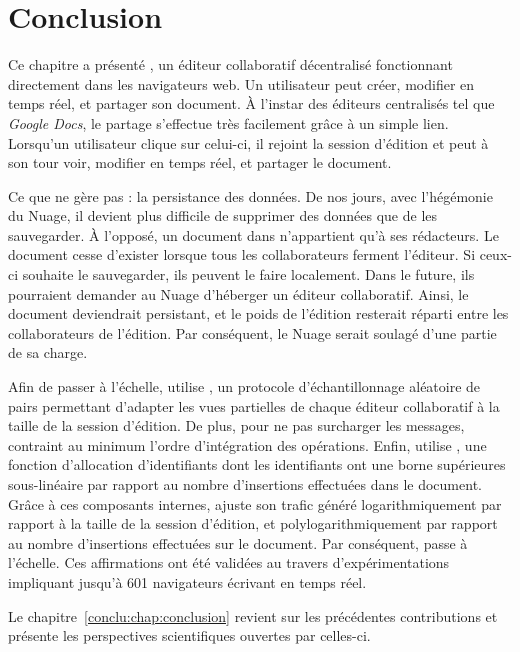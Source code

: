 
\section{Conclusion}
\label{editor:sec:conclusion}

Ce chapitre a présenté \CRATE, un éditeur collaboratif décentralisé fonctionnant
directement dans les navigateurs web. Un utilisateur peut créer, modifier en
temps réel, et partager son document. À l'instar des éditeurs centralisés tel
que \emph{Google Docs}, le partage s'effectue très facilement grâce à un simple
lien. Lorsqu'un utilisateur clique sur celui-ci, il rejoint la session d'édition
et peut à son tour voir, modifier en temps réel, et partager le document. 

Ce que \CRATE ne gère pas : la persistance des données. De nos jours, avec
l'hégémonie du Nuage, il devient plus difficile de supprimer des données que de
les sauvegarder. À l'opposé, un document dans \CRATE n'appartient qu'à ses
rédacteurs. Le document cesse d'exister lorsque tous les collaborateurs ferment
l'éditeur. Si ceux-ci souhaite le sauvegarder, ils peuvent le faire
localement. Dans le future, ils pourraient demander au Nuage d'héberger un
éditeur collaboratif. Ainsi, le document deviendrait persistant, et le poids de
l'édition resterait réparti entre les collaborateurs de l'édition. Par
conséquent, le Nuage serait soulagé d'une partie de sa charge.

Afin de passer à l'échelle, \CRATE utilise \SPRAY, un protocole
d'échantillonnage aléatoire de pairs permettant d'adapter les vues partielles de
chaque éditeur collaboratif à la taille de la session d'édition. De plus, pour
ne pas surcharger les messages, \CRATE contraint au minimum l'ordre
d'intégration des opérations. Enfin, \CRATE utilise \LSEQ, une fonction
d'allocation d'identifiants dont les identifiants ont une borne supérieures
sous-linéaire par rapport au nombre d'insertions effectuées dans le
document. Grâce à ces composants internes, \CRATE ajuste son trafic généré
logarithmiquement par rapport à la taille de la session d'édition, et
polylogarithmiquement par rapport au nombre d'insertions effectuées sur le
document. Par conséquent, \CRATE passe à l'échelle. Ces affirmations ont été
validées au travers d'expérimentations impliquant jusqu'à 601 navigateurs
écrivant en temps réel.

Le chapitre~\ref{conclu:chap:conclusion} revient sur les précédentes
contributions et présente les perspectives scientifiques ouvertes par celles-ci.

